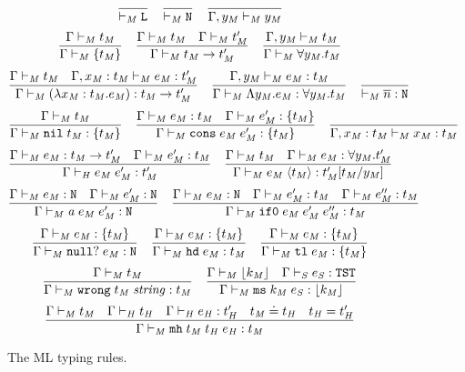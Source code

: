 \begin{figure}[p]
\setlength{\belowcaptionskip}{0pt}
\caption{The ML typing rules.}
\[
\frac
{}
{ \vdash_{\mathit{M}} \mathtt{L}}
\quad
\frac
{}
{ \vdash_{\mathit{M}} \mathtt{N}}
\quad
\frac
{}
{\Gamma , y_{\mathit{M}} \vdash_{\mathit{M}} y_{\mathit{M}}}
\]
\[
\frac
{\Gamma \vdash_{\mathit{M}} t_{\mathit{M}}}
{\Gamma \vdash_{\mathit{M}} \lbrace t_{\mathit{M}} \rbrace}
\quad
\frac
{\Gamma \vdash_{\mathit{M}} t_{\mathit{M}} \quad \Gamma \vdash_{\mathit{M}} t_{\mathit{M}}'}
{\Gamma \vdash_{\mathit{M}} t_{\mathit{M}} \rightarrow t_{\mathit{M}}'}
\quad
\frac
{\Gamma, y_{\mathit{M}} \vdash_{\mathit{M}} t_{\mathit{M}}}
{\Gamma \vdash_{\mathit{M}} \forall y_{\mathit{M}} . t_{\mathit{M}}}
\]
\bigskip
\[
\frac
{\Gamma \vdash_{\mathit{M}} t_{\mathit{M}} \quad \Gamma , x_{\mathit{M}} : t_{\mathit{M}} \vdash_{\mathit{M}} e_{\mathit{M}} : t_{\mathit{M}}'}
{\Gamma \vdash_{\mathit{M}} (\lambda x_{\mathit{M}} : t_{\mathit{M}} . e_{\mathit{M}}) : t_{\mathit{M}} \rightarrow t_{\mathit{M}}'}
\quad
\frac
{\Gamma , y_{\mathit{M}} \vdash_{\mathit{M}} e_{\mathit{M}} : t_{\mathit{M}}}
{\Gamma \vdash_{\mathit{M}} \Lambda y_{\mathit{M}} . e_{\mathit{M}} : \forall y_{\mathit{M}} . t_{\mathit{M}}}
\quad
\frac
{}
{ \vdash_{\mathit{M}} \overline{n} : \mathtt{N}}
\]
\[
\frac
{\Gamma \vdash_{\mathit{M}} t_{\mathit{M}}}
{\Gamma \vdash_{\mathit{M}} \mathtt{nil} \; t_{\mathit{M}} : \lbrace t_{\mathit{M}} \rbrace}
\quad
\frac
{\Gamma \vdash_{\mathit{M}} e_{\mathit{M}} : t_{\mathit{M}} \quad \Gamma \vdash_{\mathit{M}} e_{\mathit{M}}' : \lbrace t_{\mathit{M}} \rbrace}
{\Gamma \vdash_{\mathit{M}} \mathtt{cons} \; e_{\mathit{M}} \; e_{\mathit{M}}' : \lbrace t_{\mathit{M}} \rbrace}
\quad
\frac
{}
{\Gamma , x_{\mathit{M}} : t_{\mathit{M}} \vdash_{\mathit{M}} x_{\mathit{M}} : t_{\mathit{M}}}
\]
\[
\frac
{\Gamma \vdash_{\mathit{M}} e_{\mathit{M}} : t_{\mathit{M}} \rightarrow t_{\mathit{M}}' \quad \Gamma \vdash_{\mathit{M}} e_{\mathit{M}}' : t_{\mathit{M}}}
{\Gamma\vdash_{\mathit{H}}e_{\mathit{M}} \; e_{\mathit{M}}':t_{\mathit{M}}'}
\quad
\frac
{\Gamma \vdash_{\mathit{M}} t_{\mathit{M}} \quad \Gamma \vdash_{\mathit{M}} e_{\mathit{M}} : \forall y_{\mathit{M}} . t_{\mathit{M}}'}
{\Gamma \vdash_{\mathit{M}} e_{\mathit{M}} \; \langle t_{\mathit{M}} \rangle : t_{\mathit{M}}'[t_{\mathit{M}}/y_{\mathit{M}}]}
\]
\[
\frac
{\Gamma \vdash_{\mathit{M}} e_{\mathit{M}} : \mathtt{N} \quad \Gamma \vdash_{\mathit{M}} e_{\mathit{M}}' : \mathtt{N}}
{\Gamma \vdash_{\mathit{M}} \mathit{a} \; e_{\mathit{M}} \; e_{\mathit{M}}' : \mathtt{N}}
\quad
\frac
{\Gamma \vdash_{\mathit{M}} e_{\mathit{M}} : \mathtt{N} \quad \Gamma \vdash_{\mathit{M}} e_{\mathit{M}}' : t_{\mathit{M}} \quad \Gamma \vdash_{\mathit{M}} e_{\mathit{M}}'' : t_{\mathit{M}}}
{\Gamma \vdash_{\mathit{M}} \mathtt{if0} \; e_{\mathit{M}} \; e_{\mathit{M}}' \; e_{\mathit{M}}'' : t_{\mathit{M}}}
\]
\[
\frac
{\Gamma \vdash_{\mathit{M}} e_{\mathit{M}} : \lbrace t_{\mathit{M}} \rbrace}
{\Gamma \vdash_{\mathit{M}} \mathtt{null?} \; e_{\mathit{M}} : \mathtt{N}}
\quad
\frac
{\Gamma \vdash_{\mathit{M}} e_{\mathit{M}} : \lbrace t_{\mathit{M}} \rbrace}
{\Gamma \vdash_{\mathit{M}} \mathtt{hd} \; e_{\mathit{M}} : t_{\mathit{M}}}
\quad
\frac
{\Gamma \vdash_{\mathit{M}} e_{\mathit{M}} : \lbrace t_{\mathit{M}} \rbrace}
{\Gamma \vdash_{\mathit{M}} \mathtt{tl} \; e_{\mathit{M}} : \lbrace t_{\mathit{M}} \rbrace}
\]
\[
\frac
{\Gamma \vdash_{\mathit{M}} t_{\mathit{M}}}
{\Gamma \vdash_{\mathit{M}} \mathtt{wrong} \; t_{\mathit{M}} \; \mathit{string} : t_{\mathit{M}}}
\quad
\frac
{\Gamma \vdash_{\mathit{M}} \lfloor k_{\mathit{M}} \rfloor \quad \Gamma \vdash_{\mathit{S}} e_{\mathit{S}} : \mathtt{TST}}
{\Gamma \vdash_{\mathit{M}} \mathtt{ms} \; k_{\mathit{M}} \; e_{\mathit{S}} : \lfloor k_{\mathit{M}} \rfloor}
\]
\[
\frac
{\Gamma \vdash_{\mathit{M}} t_{\mathit{M}} \quad \Gamma \vdash_{\mathit{H}} t_{\mathit{H}} \quad \Gamma \vdash_{\mathit{H}} e_{\mathit{H}} : t_{\mathit{H}}' \quad t_{\mathit{M}} \doteq t_{\mathit{H}} \quad t_{\mathit{H}} = t_{\mathit{H}}'}
{\Gamma \vdash_{\mathit{M}} \mathtt{mh} \; t_{\mathit{M}} \; t_{\mathit{H}} \; e_{\mathit{H}} : t_{\mathit{M}}}
\]
\label{figmtr}
\end{figure}